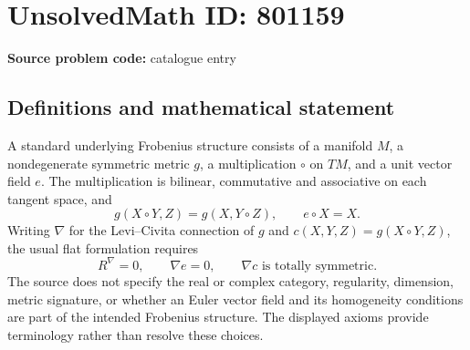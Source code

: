 \documentclass[11pt]{article}
\begin{document}
\section*{UnsolvedMath ID: 801159}
\textbf{Source problem code:} catalogue entry
\subsection{Definitions and mathematical statement}
A standard underlying Frobenius structure consists of a manifold \(M\), a nondegenerate symmetric metric \(g\), a multiplication \(\circ\) on \(TM\), and a unit vector field \(e\). The multiplication is bilinear, commutative and associative on each tangent space, and
\[
 g(X\circ Y,Z)=g(X,Y\circ Z),\qquad e\circ X=X.
\]
Writing \(\nabla\) for the Levi--Civita connection of \(g\) and \(c(X,Y,Z)=g(X\circ Y,Z)\), the usual flat formulation requires
\[
 R^\nabla=0,\qquad \nabla e=0,\qquad \nabla c\text{ is totally symmetric}.
\]
The source does not specify the real or complex category, regularity, dimension, metric signature, or whether an Euler vector field and its homogeneity conditions are part of the intended Frobenius structure. The displayed axioms provide terminology rather than resolve these choices.
\end{document}
